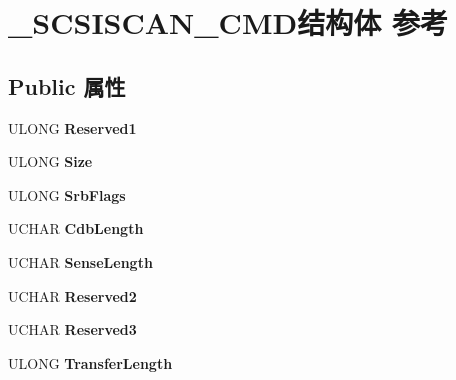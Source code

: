 \hypertarget{struct___s_c_s_i_s_c_a_n___c_m_d}{}\section{\+\_\+\+S\+C\+S\+I\+S\+C\+A\+N\+\_\+\+C\+M\+D结构体 参考}
\label{struct___s_c_s_i_s_c_a_n___c_m_d}
\subsection*{Public 属性}
\begin{DoxyCompactItemize}
\item 
\mbox{\label{struct___s_c_s_i_s_c_a_n___c_m_d_a2be578311b4cb9d15d85faa8b2a22d0b}} 
U\+L\+O\+NG {\bfseries Reserved1}
\item 
\mbox{\label{struct___s_c_s_i_s_c_a_n___c_m_d_a9baac74573a71e273b4a6d8aba124081}} 
U\+L\+O\+NG {\bfseries Size}
\item 
\mbox{\label{struct___s_c_s_i_s_c_a_n___c_m_d_a6976df71538d640b45c2246f6b9bab1b}} 
U\+L\+O\+NG {\bfseries Srb\+Flags}
\item 
\mbox{\label{struct___s_c_s_i_s_c_a_n___c_m_d_a832216b9d64cb4bb57d588c70d6a7698}} 
U\+C\+H\+AR {\bfseries Cdb\+Length}
\item 
\mbox{\label{struct___s_c_s_i_s_c_a_n___c_m_d_a4cfc825684ac46f52e535c36a5744129}} 
U\+C\+H\+AR {\bfseries Sense\+Length}
\item 
\mbox{\label{struct___s_c_s_i_s_c_a_n___c_m_d_af3da87ef4b44186aae339c2ed618b312}} 
U\+C\+H\+AR {\bfseries Reserved2}
\item 
\mbox{\label{struct___s_c_s_i_s_c_a_n___c_m_d_aa49aab805100adeef25aec0e69fa04ff}} 
U\+C\+H\+AR {\bfseries Reserved3}
\item 
\mbox{\label{struct___s_c_s_i_s_c_a_n___c_m_d_aaae4e55787a6ab5ee1f405d37d88937f}} 
U\+L\+O\+NG {\bfseries Transfer\+Length}

\end{DoxyCompactItemize}
